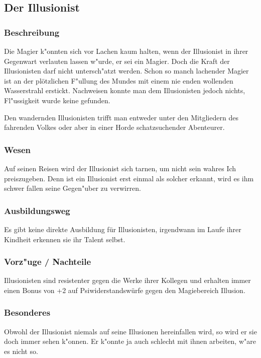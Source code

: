 \subsection{Der Illusionist}
\subsubsection{Beschreibung}
Die Magier k"onnten sich vor Lachen kaum halten, wenn der Illusionist in ihrer Gegenwart verlauten 
lassen w"urde, er sei ein Magier. Doch die Kraft der Illusionisten darf nicht untersch"atzt werden. 
Schon so manch lachender Magier ist an der plötzlichen F"ullung des Mundes mit einem nie enden 
wollenden Wasserstrahl erstickt. Nachweisen konnte man dem Illusionisten jedoch nichts, Fl"ussigkeit 
wurde keine gefunden.
\par Den wandernden Illusionisten trifft man entweder unter den Mitgliedern des fahrenden Volkes oder 
aber in einer Horde schatzsuchender Abenteurer.
\subsubsection{Wesen}
\par Auf seinen Reisen wird der Illusionist sich tarnen, um nicht sein wahres \glqq Ich\grqq{} preiszugeben. 
Denn ist ein Illusionist erst einmal als solcher erkannt, wird es ihm schwer fallen seine Gegen"uber zu verwirren.
\subsubsection{Ausbildungsweg}
\par Es gibt keine direkte Ausbildung für Illusionisten, irgendwann im Laufe ihrer Kindheit erkennen sie ihr 
Talent selbst.
\subsubsection{Vorz"uge / Nachteile}
Illusionisten sind resistenter gegen die Werke ihrer Kollegen und erhalten immer einen
Bonus von +2 auf Psiwiderstandswürfe gegen den Magiebereich Illusion.
\subsubsection{Besonderes}
\par Obwohl der Illusionist niemals auf seine Illusionen hereinfallen wird, so wird er sie doch immer sehen 
k"onnen. Er k"onnte ja auch schlecht mit ihnen arbeiten, w"are es nicht so. 
